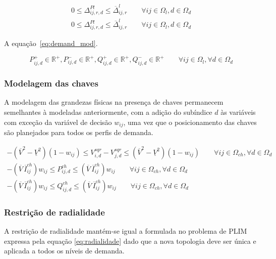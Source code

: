 \begin{align}
    0 \leq \Delta_{ij,r,d}^{Pl} \leq \overline{\Delta}_{ij,r}^l \qquad\forall ij\in\Omega_{l},d\in\Omega_d\label{eq:demand_deltaP}\\
    0 \leq \Delta_{ij,r,d}^{Pl} \leq \overline{\Delta}_{ij,r}^l \qquad\forall ij\in\Omega_{l},d\in\Omega_d\label{eq:demand_deltaQ}
\end{align}

A equação~\eqref{eq:demand_mod}.

\begin{equation}\label{eq:demand_mod}
    P_{ij,d}^{+}\in\mathbb{R}^{+}, P_{ij,d}^{-}\in\mathbb{R}^{+}, Q_{ij,d}^{+}\in\mathbb{R}^{+}, Q_{ij,d}^{-}\in\mathbb{R}^{+}\qquad\forall ij\in\Omega_{l},\forall d\in\Omega_d
\end{equation}

\subsubsection{Modelagem das chaves}

A modelagem das grandezas físicas na presença de chaves permanecem semelhantes à modeladas anteriormente, com a adição do subíndice $d$ às variáveis com exceção da variável de decisão $w_{ij}$, uma vez que o posicionamento das chaves são planejados para todos os perfis de demanda.

\begin{gather}\label{eq:demand_voltagekeys}
    -(\overline{V}^{2} - \underline{V}^{2})(1-w_{ij}) \leq V_{i,d}^{sqr} - V_{j,d}^{sqr} \leq (\overline{V}^{2} - \underline{V}^{2})(1-w_{ij})\qquad\forall ij\in\Omega_{ch},\forall d\in\Omega_d\\
    \label{eq:demand_Pch}
    -(\overline{V}\,\overline{I}_{ij}^{ch})w_{ij} \leq P_{ij,d}^{ch} \leq (\overline{V}\,\overline{I}_{ij}^{ch})w_{ij}\qquad\forall ij\in\Omega_{ch},\forall d\in\Omega_d\\
    \label{eq:demand_Qch}
    -(\overline{V}\,\overline{I}_{ij}^{ch})w_{ij} \leq Q_{ij,d}^{ch} \leq (\overline{V}\,\overline{I}_{ij}^{ch})w_{ij}\qquad\forall ij\in\Omega_{ch},\forall d\in\Omega_d
\end{gather}

\subsubsection{Restrição de radialidade}

A restrição de radialidade mantém-se igual a formulada no problema de PLIM expressa pela equação \eqref{eq:radialidade} dado que a nova topologia deve ser única e aplicada a todos os níveis de demanda.

